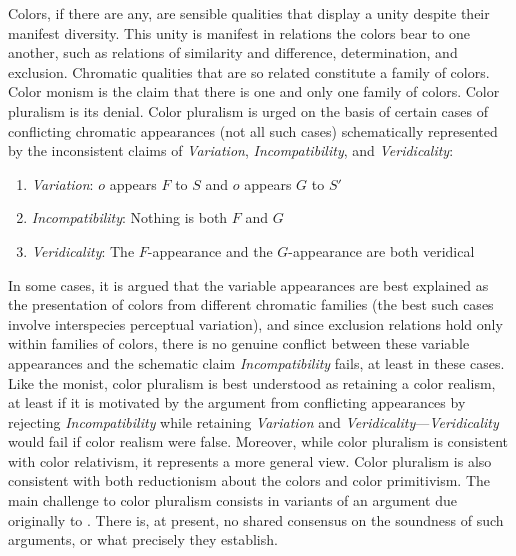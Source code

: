 \documentclass[12pt]{article}
\begin{document}
Colors, if there are any, are sensible qualities that display a unity despite their manifest diversity. This unity is manifest in relations the colors bear to one another, such as relations of similarity and difference, determination, and exclusion. Chromatic qualities that are so related constitute a family of colors. Color monism is the claim that there is one and only one family of colors. Color pluralism is its denial. Color pluralism is urged on the basis of certain cases of conflicting chromatic appearances (not all such cases) schematically represented by the inconsistent claims of \emph{Variation}, \emph{Incompatibility}, and \emph{Veridicality}: 
\begin{enumerate}
	\item \emph{Variation}: \( o \) appears \( F \) to \( S \) and \( o \) appears \( G \) to \( S' \)
	\item \emph{Incompatibility}: Nothing is both \( F \) and \( G \)
	\item \emph{Veridicality}: The \( F \)-appearance and the \( G \)-appearance are both veridical
\end{enumerate}
In some cases, it is argued that the variable appearances are best explained as the presentation of colors from different chromatic families (the best such cases involve interspecies perceptual variation), and since exclusion relations hold only within families of colors, there is no genuine conflict between these variable appearances and the schematic claim \emph{Incompatibility} fails, at least in these cases. Like the monist, color pluralism is best understood as retaining a color realism, at least if it is motivated by the argument from conflicting appearances by rejecting \emph{Incompatibility} while retaining \emph{Variation} and \emph{Veridicality}---\emph{Veridicality} would fail if color realism were false. Moreover, while color pluralism is consistent with color relativism, it represents a more general view. Color pluralism is also consistent with both reductionism about the colors and color primitivism. The main challenge to color pluralism consists in variants of an argument due originally to \citet{Shoemaker:2003wk}. There is, at present, no shared consensus on the soundness of such arguments, or what precisely they establish.



\nocite{Cooper:1997fk}
\nocite{Hett:1936fk}
\nocite{Heraclitus:1979uq}

 
 
\end{document}
